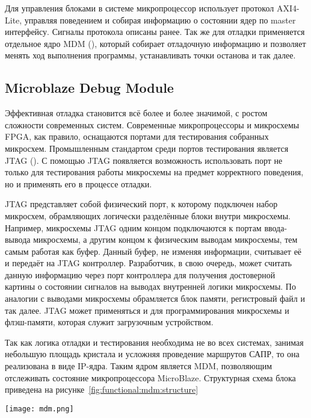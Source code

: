 Для управления блоками в системе микропроцессор использует протокол AXI4-Lite, управляя
поведением и собирая информацию о состоянии ядер по master интерфейсу. Сигналы протокола
описаны ранее. Так же для отладки применяется отдельное ядро MDM (), который собирает
отладочную информацию и позволяет менять ход выполнения программы, устанавливать точки останова и
так далее.

\subsection{Microblaze Debug Module}
\label{sec:functional:mdm}

Эффективная отладка становится всё более и более значимой, с ростом сложности современных систем. Современные
микропроцессоры и микросхемы FPGA, как правило, оснащаются портами для тестирования собранных микросхем. Промышленным
стандартом среди портов тестирования является JTAG (). С помощью JTAG появляется возможность
использовать порт не только для тестирования работы микросхемы на предмет корректного поведения, но и применять
его в процессе отладки.

JTAG представляет собой физический порт, к которому подключен набор микросхем, обрамляющих
логически разделённые блоки внутри микросхемы. Например, микросхемы JTAG одним концом подключаются к портам
ввода-вывода микросхемы, а другим концом к физическим выводам микросхемы, тем самым работая как буфер. Данный
буфер, не изменяя информации, считывает её и передаёт на JTAG контроллер. Разработчик, в свою очередь, может
считать данную информацию через порт контроллера для получения достоверной картины о состоянии сигналов
на выводах внутренней логики микросхемы. По аналогии с выводами микросхемы обрамляется блок памяти, регистровый
файл и так далее. JTAG может применяться и для программирования микросхемы и флэш-памяти, которая служит
загрузочным устройством.

Так как логика отладки и тестирования необходима не во всех системах, занимая небольшую площадь кристала
и усложняя проведение маршрутов САПР, то она реализована в виде IP-ядра. Таким ядром является MDM,
позволяющим отслеживать состояние  микропроцессора MicroBlaze. Структурная схема блока
приведена на рисунке~\ref{fig:functional:mdm:structure}

\begin{center}
  \centering
  \texttt{[image: mdm.png]}
  \label{fig:functional:mdm:structure}
\end{center}

